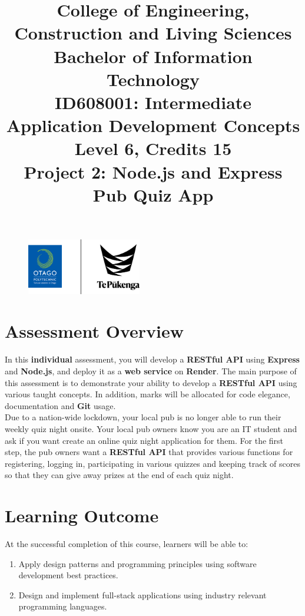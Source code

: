 \documentclass{article}
\author{}
\begin{document}
\begin{figure}
	\centering 
	\includegraphics[width=50mm]{../../resources/img/logo.png}
\end{figure}

\title{College of Engineering, Construction and Living Sciences\\Bachelor of Information Technology\\ID608001: Intermediate Application Development Concepts\\Level 6, Credits 15\\\textbf{Project 2: Node.js and Express Pub Quiz App}}
\date{}
\maketitle

\section*{Assessment Overview}
In this \textbf{individual} assessment, you will develop a \textbf{RESTful API} using \textbf{Express} and \textbf{Node.js}, and deploy it as a \textbf{web service} on \textbf{Render}. The main purpose of this assessment is to demonstrate your ability to develop a \textbf{RESTful API} using various taught concepts. In addition, marks will be allocated for code elegance, documentation and \textbf{Git} usage.\\

Due to a nation-wide lockdown, your local pub is no longer able to run their weekly quiz night onsite. Your local pub owners know you are an IT student and ask if you want create an online quiz night application for them. For the first step, the pub owners want a \textbf{RESTful API} that provides various functions for registering, logging in, participating in various quizzes and keeping track of scores so that they can give away prizes at the end of each quiz night.

\section*{Learning Outcome}
At the successful completion of this course, learners will be able to:
\begin{enumerate}
	\item Apply design patterns and programming principles using software development best practices.
	\item Design and implement full-stack applications using industry relevant programming languages.
\end{enumerate}
\end{document}
